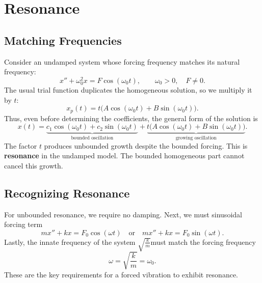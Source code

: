 \documentclass[10pt,letterpaper]{article}
\begin{document}


\section{Resonance}

\subsection{Matching Frequencies}

Consider an undamped system whose forcing frequency
matches its natural frequency:
\[
x''+\omega_0^2x=F\cos(\omega_0t),
\qquad \omega_0>0,\quad F\ne0.
\]
The usual trial function duplicates the homogeneous
solution, so we multiply it by $t$:
\[
x_p(t)=t\bigl(A\cos(\omega_0t)+B\sin(\omega_0t)\bigr).
\]
Thus, even before determining the coefficients, the
general form of the solution is 
\[
x(t)=
\underbrace{c_1\cos(\omega_0t)+c_2\sin(\omega_0t)}
_{\text{bounded oscillation}}
+
\underbrace{t\bigl(A\cos(\omega_0t)+B\sin(\omega_0t)\bigr)}
_{\text{growing oscillation}}.
\]
The factor $t$ produces unbounded growth despite the
bounded forcing. This is \textbf{resonance} in the
undamped model. The bounded homogeneous part cannot
cancel this growth. 

\subsection{Recognizing Resonance}

For unbounded resonance, we require no damping. Next, we must sinusoidal forcing term
\[
mx''+kx=F_0\cos(\omega t)
\quad\text{or}\quad
mx''+kx=F_0\sin(\omega t).
\]
Lastly, the innate frequency of the system $\sqrt{\frac{k}{m}}$must match the forcing frequency
\[
\boxed{\omega=\sqrt{\frac{k}{m}}=\omega_0.}
\]
These are the key requirements for a forced vibration to exhibit resonance. 
\end{document}
